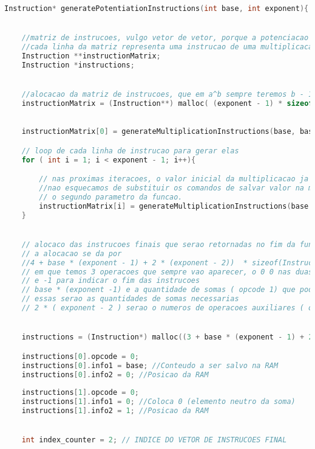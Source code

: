 \documentclass{article}
\begin{document}
\begin{lstlisting}[caption={Função generatePotentiationInstructions},label={lst:cod4},language=C]
Instruction* generatePotentiationInstructions(int base, int exponent){


    //matriz de instrucoes, vulgo vetor de vetor, porque a potenciacao sao varias multiplicacoes.
    //cada linha da matriz representa uma instrucao de uma multiplicacao
    Instruction **instructionMatrix;
    Instruction *instructions;


    //alocacao da matriz de instrucoes, que em a^b sempre teremos b - 1 linhas
    instructionMatrix = (Instruction**) malloc( (exponent - 1) * sizeof(Instruction));
    

    instructionMatrix[0] = generateMultiplicationInstructions(base, base);

    // loop de cada linha de instrucao para gerar elas
    for ( int i = 1; i < exponent - 1; i++){

        // nas proximas iteracoes, o valor inicial da multiplicacao ja esta na memoria RAM, isso desde que
        //nao esquecamos de substituir os comandos de salvar valor na memoria ( opcode = 0), por isso nao fara diferenca
        // o segundo parametro da funcao.
        instructionMatrix[i] = generateMultiplicationInstructions(base , 0);
    }


    // alocaco das instrucoes finais que serao retornadas no fim da funcao.
    // a alocacao se da por 
    //4 + base * (exponent - 1) + 2 * (exponent - 2))  * sizeof(Instruction))
    // em que temos 3 operacoes que sempre vao aparecer, o 0 0 nas duas primeiras instrucoes
    // e -1 para indicar o fim das instrucoes
    // base * (exponent -1) e a quantidade de somas ( opcode 1) que podemos encontrar no meio da matriz.
    // essas serao as quantidades de somas necessarias
    // 2 * ( exponent - 2 ) serao o numeros de operacoes auxiliares ( opcode 3 e 0) para a manipulacao necessaria da Ram


    instructions = (Instruction*) malloc((3 + base * (exponent - 1) + 2 * (exponent - 2))  * sizeof(Instruction));

    instructions[0].opcode = 0;
    instructions[0].info1 = base; //Conteudo a ser salvo na RAM
    instructions[0].info2 = 0; //Posicao da RAM
    
    instructions[1].opcode = 0;
    instructions[1].info1 = 0; //Coloca 0 (elemento neutro da soma)
    instructions[1].info2 = 1; //Posicao da RAM


    int index_counter = 2; // INDICE DO VETOR DE INSTRUCOES FINAL



\end{lstlisting}
\end{document}
